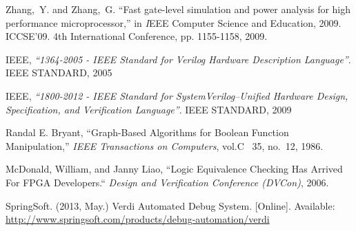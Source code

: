 \begin{thebibliography}{10}
Zhang,~Y. and Zhang,~G. ``Fast gate-level simulation and power analysis for high performance microprocessor,'' in {\emph IEEE Computer Science and Education, 2009. ICCSE'09. 4th International Conference}, pp. 1155-1158, 2009.


  IEEE,
  \emph{``1364-2005 - IEEE Standard for Verilog Hardware Description
  Language''}.
	IEEE STANDARD,
	2005

  IEEE,
	\emph{``1800-2012 - IEEE Standard for SystemVerilog--Unified Hardware Design,
  Specification, and Verification Language''}.
	IEEE STANDARD,
	2009

Randal E. Bryant,
  ``Graph-Based Algorithms for Boolean Function Manipulation,'' \emph{IEEE Transactions on Computers}, vol.C ~35, no.~12, 1986.

McDonald, William, and Janny Liao,
	``Logic Equivalence Checking Has Arrived For FPGA Developers.`` \emph{Design and Verification Conference (DVCon)}, 2006.

\BIBentryALTinterwordspacing
SpringSoft. (2013, May.) {Verdi Automated Debug System}. [Online]. Available:
  \url{http://www.springsoft.com/products/debug-automation/verdi}
\BIBentrySTDinterwordspacing


\end{thebibliography}
